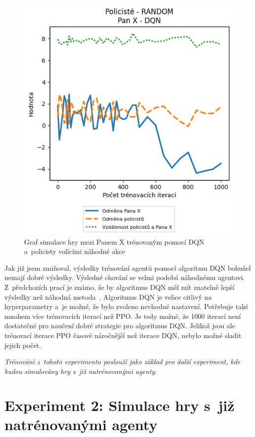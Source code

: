 \begin{figure}[H]
\begin{minipage}{.48\textwidth}
    \includegraphics[width=1\textwidth]{obrazky-figures/graphs/cop_RANDOM_mrx_DQN}
      \caption{Graf simulace hry mezi Panem X trénovaným pomocí DQN a~policisty volícími náhodné akce}
      \label{fig:cop_random_mrx_dqn}
  \end{minipage}
  \label{fig:srovnani_dqn}
  \end{figure}

Jak již jsem zmiňoval, výsledky trénování agentů pomocí algoritmu DQN bohužel nemají dobré výsledky.
Výsledné chování se velmi podobá náhodnému agentovi.
Z~předchozích prací je známo, že by algoritmus DQN měl mít znatelně lepší výsledky než náhodná metoda~\cite{Hrklova2023thesis}.
Algoritmus DQN je velice citlivý na hyperparametry a~je možné, že bylo zvoleno nevhodné nastavení.
Potřebuje také mnohem více trénovacích iterací než PPO\@.
Je tedy možné, že 1000 iterací není dostatečné pro naučení dobré strategie pro algoritmus DQN\@.
Jelikož jsou ale trénovací iterace PPO časově náročnější než iterace DQN, nebylo možné sladit jejich počet.

\emph{Trénování z~tohoto experimentu poslouží jako základ pro další experiment, kde budou simulovány hry s~již natrénovanými agenty.}

\section{Experiment 2: Simulace hry s~již natrénovanými agenty}
\label{sec:experiment-2}

